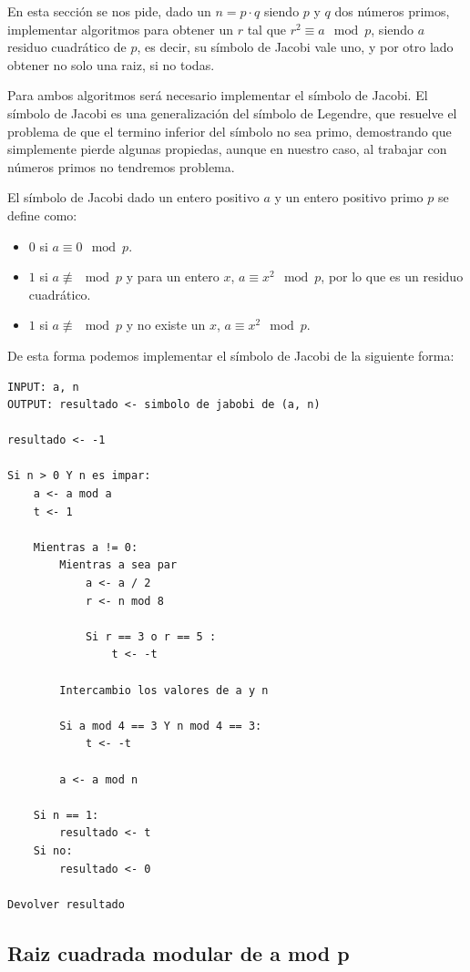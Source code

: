 \documentclass[12pt, spanish]{article}
\begin{document}
En esta sección se nos pide, dado un $n = p \cdot q$ siendo $p$ y $q$ dos números primos, implementar algoritmos para obtener un $r$ tal que $r^2 \equiv a \mod p$, siendo $a$ residuo cuadrático de $p$, es decir, su símbolo de Jacobi vale uno, y por otro lado obtener no solo una raiz, si no todas.

Para ambos algoritmos será necesario implementar el símbolo de Jacobi. El símbolo de Jacobi es una generalización del símbolo de Legendre, que resuelve el problema de que el termino inferior del símbolo no sea primo, demostrando que simplemente pierde algunas propiedas, aunque en nuestro caso, al trabajar con números primos no tendremos problema.

El símbolo de Jacobi dado un entero positivo $a$ y un entero positivo primo $p$ se define como:

\begin{itemize}
	\item $0$ si $a \equiv 0 \mod p$.
	\item $1$ si $a \not \equiv \mod p$ y para un entero $x$, $a \equiv x^2 \mod p$, por lo que es un residuo cuadrático.
	\item $1$ si $a \not \equiv \mod p$ y no existe un $x$, $a \equiv x^2 \mod p$.
\end{itemize}

De esta forma podemos implementar el símbolo de Jacobi de la siguiente forma:

\begin{lstlisting}[caption={Símbolo de Jacobi}]
INPUT: a, n
OUTPUT: resultado <- simbolo de jabobi de (a, n)

resultado <- -1

Si n > 0 Y n es impar:
	a <- a mod a
	t <- 1

	Mientras a != 0:
		Mientras a sea par
			a <- a / 2
			r <- n mod 8

			Si r == 3 o r == 5 :
				t <- -t

		Intercambio los valores de a y n

		Si a mod 4 == 3 Y n mod 4 == 3:
			t <- -t

		a <- a mod n

	Si n == 1:
		resultado <- t
	Si no:
		resultado <- 0

Devolver resultado
\end{lstlisting}

\subsection{Raiz cuadrada modular de a mod p}
\end{document}

